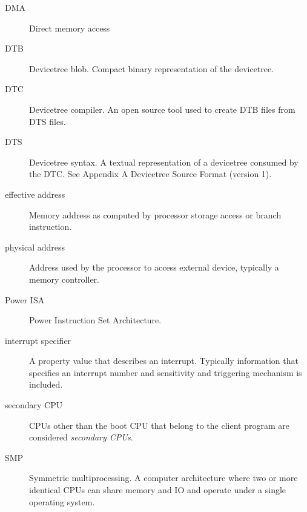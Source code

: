 \documentclass[a4paper,10pt,oneside]{sphinxmanual}
\begin{document}
\begin{description}
\item[{DMA}] \leavevmode{}\label{introduction:term-dma}
Direct memory access

\item[{DTB}] \leavevmode{}\label{introduction:term-dtb}
Devicetree blob. Compact binary representation of the devicetree.

\item[{DTC}] \leavevmode{}\label{introduction:term-dtc}
Devicetree compiler. An open source tool used to create DTB files
from DTS files.

\item[{DTS}] \leavevmode{}\label{introduction:term-dts}
Devicetree syntax. A textual representation of a devicetree
consumed by the DTC. See Appendix A Devicetree Source Format
(version 1).

\item[{effective address}] \leavevmode{}\label{introduction:term-effective-address}
Memory address as computed by processor storage access or branch
instruction.

\item[{physical address}] \leavevmode{}\label{introduction:term-physical-address}
Address used by the processor to access external device, typically a
memory controller.

\item[{Power ISA}] \leavevmode{}\label{introduction:term-power-isa}
Power Instruction Set Architecture.

\item[{interrupt specifier}] \leavevmode{}\label{introduction:term-interrupt-specifier}
A property value that describes an interrupt. Typically information
that specifies an interrupt number and sensitivity and triggering
mechanism is included.

\item[{secondary CPU}] \leavevmode{}\label{introduction:term-secondary-cpu}
CPUs other than the boot CPU that belong to the client program are
considered \emph{secondary CPUs}.

\item[{SMP}] \leavevmode{}\label{introduction:term-smp}
Symmetric multiprocessing. A computer architecture where two or more
identical CPUs can share memory and IO and operate under a single operating
system.


\end{description}
\end{document}
